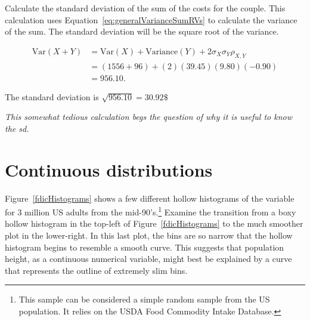 \begin{example}{Calculate the standard deviation of the sum of the costs for the couple.}
This calculation uses Equation~\ref{eq:generalVarianceSumRVs} to calculate the variance of the sum.  The standard deviation will be the square root of the variance.

\begin{align*} 
	\text{Var}(X + Y) &= \text{Var}(X) + \text{Variance}(Y) + 
	2 \sigma_X \sigma_Y \rho_{X,Y} \\
	&= (1556 + 96) + (2)(39.45)(9.80)(-0.90) \\
	& = 956.10.
\end{align*}

The standard deviation is $\sqrt{956.10} = 30.92\$$

\textit{This somewhat tedious calculation begs the question of why it is useful to know the sd.}

\end{example}



\section{Continuous distributions}
\label{contDist}


Figure~\ref{fdicHistograms} shows a few different hollow histograms of the variable  for 3 million US adults from the mid-90's.\footnote{This sample can be considered a simple random sample from the US population. It relies on the USDA Food Commodity Intake Database.} Examine the transition from a boxy hollow histogram in the top-left of Figure~\ref{fdicHistograms} to the much smoother plot in the lower-right. In this last plot, the bins are so narrow that the hollow histogram begins to resemble a smooth curve. This suggests that population height, as a continuous numerical variable, might best be explained by a curve that represents the outline of extremely slim bins.

